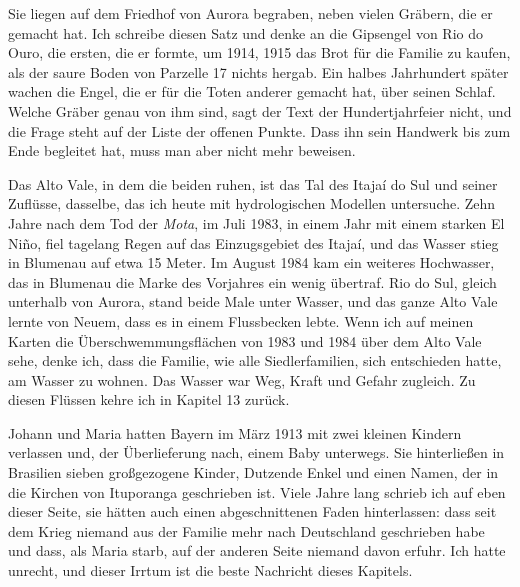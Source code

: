 \documentclass[
  ngerman,
  11pt,
  openany]{book}
\begin{document}
Sie liegen auf dem Friedhof von Aurora begraben, neben vielen Gräbern,
die er gemacht hat. Ich schreibe diesen Satz und denke an die Gipsengel
von Rio do Ouro, die ersten, die er formte, um 1914, 1915 das Brot für
die Familie zu kaufen, als der saure Boden von Parzelle 17 nichts
hergab. Ein halbes Jahrhundert später wachen die Engel, die er für die
Toten anderer gemacht hat, über seinen Schlaf. Welche Gräber genau von
ihm sind, sagt der Text der Hundertjahrfeier nicht, und die Frage steht
auf der Liste der offenen Punkte. Dass ihn sein Handwerk bis zum Ende
begleitet hat, muss man aber nicht mehr beweisen.

Das Alto Vale, in dem die beiden ruhen, ist das Tal des Itajaí do Sul
und seiner Zuflüsse, dasselbe, das ich heute mit hydrologischen Modellen
untersuche. Zehn Jahre nach dem Tod der \emph{Mota}, im Juli 1983, in
einem Jahr mit einem starken El Niño, fiel tagelang Regen auf das
Einzugsgebiet des Itajaí, und das Wasser stieg in Blumenau auf etwa 15
Meter. Im August 1984 kam ein weiteres Hochwasser, das in Blumenau die
Marke des Vorjahres ein wenig übertraf. Rio do Sul, gleich unterhalb von
Aurora, stand beide Male unter Wasser, und das ganze Alto Vale lernte
von Neuem, dass es in einem Flussbecken lebte. Wenn ich auf meinen
Karten die Überschwemmungsflächen von 1983 und 1984 über dem Alto Vale
sehe, denke ich, dass die Familie, wie alle Siedlerfamilien, sich
entschieden hatte, am Wasser zu wohnen. Das Wasser war Weg, Kraft und
Gefahr zugleich. Zu diesen Flüssen kehre ich in Kapitel 13 zurück.

Johann und Maria hatten Bayern im März 1913 mit zwei kleinen Kindern
verlassen und, der Überlieferung nach, einem Baby unterwegs. Sie
hinterließen in Brasilien sieben großgezogene Kinder, Dutzende Enkel und
einen Namen, der in die Kirchen von Ituporanga geschrieben ist. Viele
Jahre lang schrieb ich auf eben dieser Seite, sie hätten auch einen
abgeschnittenen Faden hinterlassen: dass seit dem Krieg niemand aus der
Familie mehr nach Deutschland geschrieben habe und dass, als Maria
starb, auf der anderen Seite niemand davon erfuhr. Ich hatte unrecht,
und dieser Irrtum ist die beste Nachricht dieses Kapitels.
\end{document}

